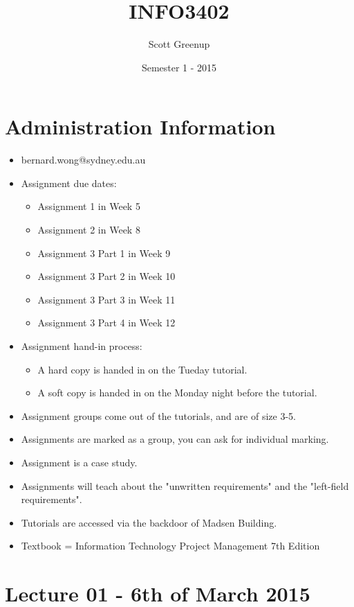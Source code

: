 \documentclass[a4paper,10pt]{article}
\newcommand{\subtitle}[1]{%
    \posttitle{%
        \par\end{center}
        \begin{center}\large#1\end{center}
        \vskip0.5em }%
}
\begin{document}
\title{INFO3402}
\subtitle{Lecture Notes}
\date{Semester 1 - 2015}
\author{Scott Greenup}
\maketitle

\section{Administration Information}
\begin{itemize}
    \item bernard.wong@sydney.edu.au
    \item Assignment due dates:
    \begin{itemize}
        \item Assignment 1 in Week 5
        \item Assignment 2 in Week 8
        \item Assignment 3 Part 1 in Week 9
        \item Assignment 3 Part 2 in Week 10
        \item Assignment 3 Part 3 in Week 11
        \item Assignment 3 Part 4 in Week 12
    \end{itemize}
    \item Assignment hand-in process:
    \begin{itemize}
        \item A hard copy is handed in on the Tueday tutorial.
        \item A soft copy is handed in on the Monday night before the tutorial.
    \end{itemize}
    \item Assignment groups come out of the tutorials, and are of size 3-5.
    \item Assignments are marked as a group, you can ask for individual marking.
    \item Assignment is a case study.
    \item Assignments will teach about the "unwritten requirements" and the "left-field requirements".
    \item Tutorials are accessed via the backdoor of Madsen Building.
    \item Textbook = Information Technology Project Management 7th Edition
\end{itemize}

\section{Lecture 01 - 6th of March 2015}
\end{document}
